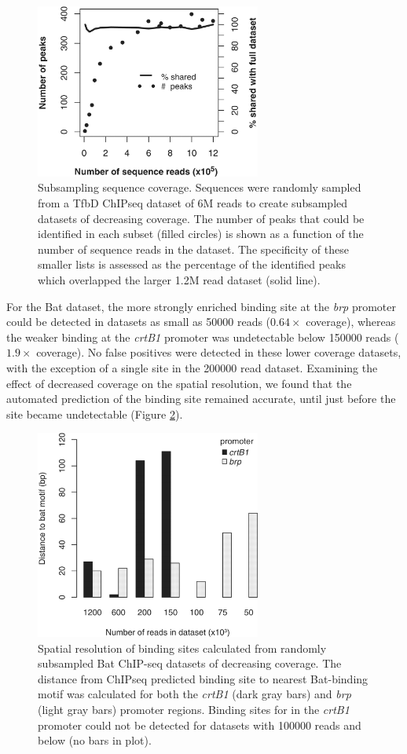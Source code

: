 \begin{figure}
\centering
\includegraphics[width=20em]{SaltyBugs/figures/fig7}
\caption{Subsampling sequence coverage. Sequences were randomly sampled from a TfbD ChIPseq dataset of 6M reads to create subsampled datasets of decreasing coverage. The number of peaks that could be identified in each subset (filled circles) is shown as a function of the number of sequence reads in the dataset. The specificity of these smaller lists is assessed as the percentage of the identified peaks which overlapped the larger 1.2M read dataset (solid line).}
\label{SB_fig7}
\end{figure}

For the Bat dataset, the more strongly enriched binding site at the {\em brp} promoter could be detected in datasets as small as 50000 reads ($0.64\times$ coverage), whereas the weaker binding at the {\em crtB1} promoter was undetectable below 150000 reads ($1.9\times$ coverage). No false positives were detected in these lower coverage datasets, with the exception of a single site in the 200000 read dataset. Examining the effect of decreased coverage on the spatial resolution, we found that the automated prediction of the binding site remained accurate, until just before the site became undetectable (Figure \ref{SB_fig8}).


\begin{figure}
\centering
\includegraphics[width=20em]{SaltyBugs/figures/fig8}
\caption{Spatial resolution of binding sites calculated from randomly subsampled Bat ChIP-seq datasets of decreasing coverage. The distance from ChIPseq predicted binding site to nearest Bat-binding motif was calculated for both the {\em crtB1} (dark gray bars) and {\em brp} (light gray bars) promoter regions. Binding sites for in the {\em crtB1} promoter could not be detected for datasets with 100000 reads and below (no bars in plot).}
\label{SB_fig8}
\end{figure}
